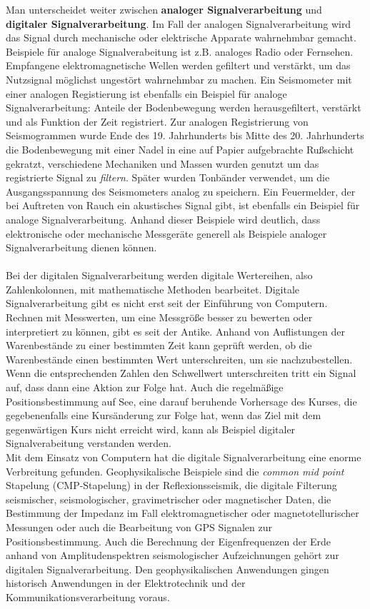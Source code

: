 Man unterscheidet weiter zwischen \textbf{analoger Signalverarbeitung} und \textbf{digitaler Signalverarbeitung}. Im Fall der analogen Signalverarbeitung wird das Signal durch mechanische oder elektrische Apparate wahrnehmbar gemacht. Beispiele für analoge Signalverabeitung ist z.B. analoges Radio oder Fernsehen. Empfangene elektromagnetische Wellen werden gefiltert und verstärkt, um das Nutzsignal möglichst ungestört wahrnehmbar zu machen. Ein Seismometer mit einer analogen Registierung ist ebenfalls ein Beispiel für analoge Signalverarbeitung: Anteile der Bodenbewegung werden herausgefiltert, verstärkt und als Funktion der Zeit registriert. Zur analogen Registrierung von Seismogrammen wurde Ende des 19. Jahrhunderts bis Mitte des 20. Jahrhunderts die Bodenbewegung mit einer Nadel in eine auf Papier aufgebrachte Rußschicht gekratzt, verschiedene Mechaniken und Massen wurden genutzt um das registrierte Signal zu \textit{filtern}. Später wurden Tonbänder verwendet, um die Ausgangsspannung des Seismometers analog zu speichern. Ein Feuermelder, der bei Auftreten von Rauch ein akustisches Signal gibt, ist ebenfalls ein Beispiel für analoge Signalverarbeitung. Anhand dieser Beispiele wird deutlich, dass elektronische oder mechanische Messgeräte generell als Beispiele analoger Signalverarbeitung dienen können.\\\\
Bei der digitalen Signalverarbeitung werden digitale Wertereihen, also Zahlenkolonnen, mit mathematische Methoden bearbeitet. Digitale Signalverarbeitung gibt es nicht erst seit der Einführung von Computern. Rechnen mit Messwerten, um eine Messgröße besser zu bewerten oder interpretiert zu können, gibt es seit der Antike. Anhand von Auflistungen der Warenbestände zu einer bestimmten Zeit kann geprüft werden, ob die Warenbestände einen bestimmten Wert unterschreiten, um sie nachzubestellen. Wenn die entsprechenden Zahlen den Schwellwert unterschreiten tritt ein Signal auf, dass dann eine Aktion zur Folge hat. Auch die regelmäßige Positionsbestimmung auf See, eine darauf beruhende Vorhersage des Kurses, die gegebenenfalls eine Kursänderung zur Folge hat, wenn das Ziel mit dem gegenwärtigen Kurs nicht erreicht wird, kann als Beispiel digitaler Signalverabeitung verstanden werden.\\

Mit dem Einsatz von Computern hat die digitale Signalverarbeitung eine enorme Verbreitung gefunden. Geophysikalische Beispiele sind die \textit{common mid point} Sta\-pelung (CMP-Stapelung) in der Reflexionsseismik, die digitale Filterung seismischer, seismologischer, gravimetrischer oder magnetischer Daten, die Bestimmung der Impedanz im Fall elektromagnetischer oder magnetotellurischer Messungen oder auch die Bearbeitung von GPS Signalen zur Positionsbestimmung. Auch die Berechnung der Eigenfrequenzen der Erde anhand von Amplitudenspektren seismologischer Aufzeichnungen gehört zur digitalen Signalverarbeitung. Den geophysikalischen Anwendungen gingen historisch Anwendungen in der Elektrotechnik und der Kommunikationsverarbeitung voraus.\\

